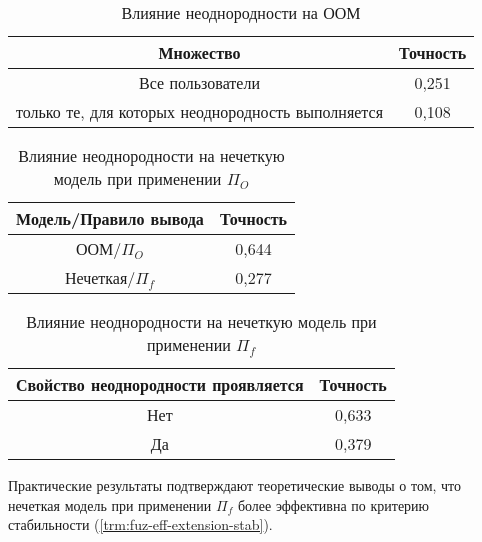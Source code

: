 \begin{table}[h]
	\caption{Влияние неоднородности на ООМ}
  \begin{center}
	\label{tbl:hetero-oom}
	\begin{tabular}{|c|c|}
	  \hline
		Множество & Точность \\ \hline
		Все пользователи & 0,251 \\ \hline
		только те, для которых неоднородность выполняется & 0,108 \\ \hline
	\end{tabular}
  \end{center}
\end{table}

\begin{table}[h]
	\caption{Влияние неоднородности на нечеткую модель при применении $\Pi_O$}
  \begin{center}
	\label{tbl:hetero-fuz-oom}
	\begin{tabular}{|c|c|}
	  \hline
		Модель/Правило вывода & Точность \\ \hline
		ООМ/$\Pi_{O}$&0,644 \\ \hline
		Нечеткая/$\Pi_{f}$&0,277 \\ \hline
	\end{tabular}
  \end{center}
\end{table}

\begin{table}[h]
	\caption{Влияние неоднородности на нечеткую модель при применении $\Pi_f$}
  \begin{center}
	\label{tbl:hetero-fuz}
	\begin{tabular}{|c|c|}
	  \hline
		Свойство неоднородности проявляется & Точность \\ \hline
		Нет & 0,633 \\ \hline
		Да & 0,379 \\ \hline
	\end{tabular}
  \end{center}
\end{table}

Практические результаты подтверждают теоретические выводы о том,
что нечеткая модель при применении $\Pi_f$ более эффективна по критерию
стабильности (\ref{trm:fuz-eff-extension-stab}).
